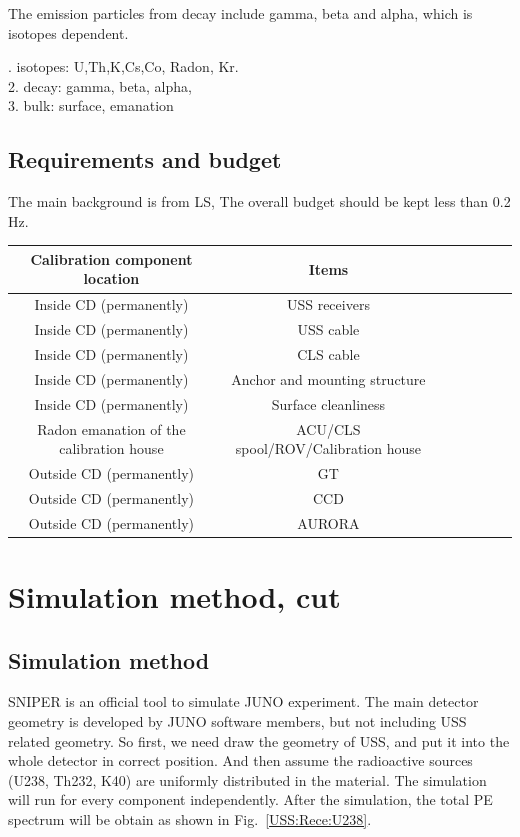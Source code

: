 \documentclass[review,number,sort&compress]{elsarticle}
\begin{document}
The emission particles from decay include gamma, beta and alpha, which is isotopes dependent.

. isotopes: U,Th,K,Cs,Co, Radon, Kr. \\
2. decay: gamma, beta, alpha,\\
3. bulk: surface, emanation\\

\subsection{Requirements and budget}

The main background is from LS, 
The overall budget should be kept less than 0.2 Hz.

\begin{center}
	\centering
	\begin{tabular*}{150mm}{@{\extracolsep{\fill}}ccccccc}
		\toprule  %
               Calibration component location & Items\\
		\midrule  %
	       Inside CD (permanently) & USS receivers\\
               Inside CD (permanently) & USS cable\\
               Inside CD (permanently) & CLS cable\\
               Inside CD (permanently) & Anchor and mounting structure\\
               Inside CD (permanently) & Surface cleanliness\\
		\midrule  %
	       Radon emanation of the calibration house & ACU/CLS spool/ROV/Calibration house\\
		\midrule  %
		Outside CD (permanently) & GT\\
		Outside CD (permanently) & CCD \\
		Outside CD (permanently) & AURORA\\
		 \bottomrule  %
\end{tabular*}
\end{center}

\section{Simulation method, cut}
\subsection{Simulation method}
SNIPER is an official tool to simulate JUNO experiment. The main detector geometry is developed by JUNO software members, but not including USS related geometry. So first, we need draw the geometry of USS, and put it into the whole detector in correct position. And then assume the radioactive sources (U238, Th232, K40) are uniformly distributed in the material. The simulation will run for every component independently. After the simulation, the total PE spectrum will be obtain as shown in Fig.~\ref{USS:Rece:U238}.
\end{document}
